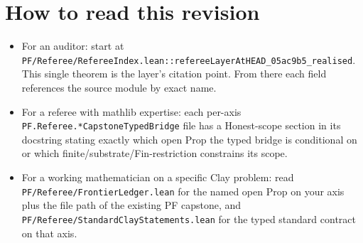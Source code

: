 \section*{How to read this revision}

\begin{itemize}
\item For an auditor: start at
\texttt{PF/Referee/RefereeIndex.lean::refereeLayerAtHEAD\_05ac9b5\_realised}.
This single theorem is the layer's citation point. From there each
field references the source module by exact name.
\item For a referee with mathlib expertise: each per-axis
\texttt{PF.Referee.*CapstoneTypedBridge} file has a Honest-scope
section in its docstring stating exactly which open Prop the typed
bridge is conditional on or which finite/substrate/Fin-restriction
constrains its scope.
\item For a working mathematician on a specific Clay problem: read
\texttt{PF/Referee/FrontierLedger.lean} for the named open Prop on
your axis plus the file path of the existing PF capstone, and
\texttt{PF/Referee/StandardClayStatements.lean} for the typed
standard contract on that axis.
\end{itemize}
